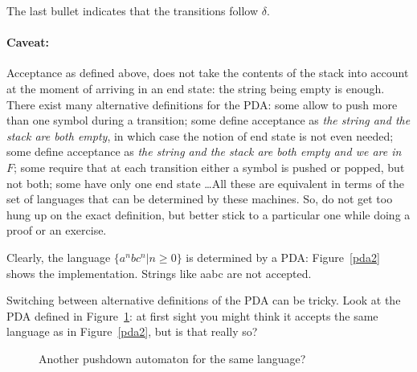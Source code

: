 The last bullet indicates that the transitions follow $\delta$.

\paragraph{Caveat:}

Acceptance as defined above, does not take the contents of the stack
into account at the moment of arriving in an end state: the string
being empty is enough. There exist many alternative definitions for
the PDA: some allow to push more than one symbol during a transition;
some define acceptance as {\em the string and the stack are both
  empty}, in which case the notion of end state is not even needed;
some define acceptance as {\em the string and the stack are both empty
  and we are in $F$}; some require that at each transition either a
symbol is pushed or popped, but not both; some have only one end state
\ldots All these are equivalent in terms of the set of languages that can
be determined by these machines. So, do not get too hung up on the
exact definition, but better stick to a particular one while doing a
proof or an exercise.



Clearly, the language $\{a^nbc^n|n \geq 0\}$ is determined by a PDA:
Figure~\ref{pda2} shows the implementation. Strings like aabc are not
accepted.

Switching between alternative definitions of the PDA can be
tricky. Look at the PDA defined in Figure~\ref{pda1}: at first sight
you might think it accepts the same language as in Figure~\ref{pda2},
but is that really so?

\begin{figure}[h]
\caption{Another pushdown automaton for the same language?\label{pda1}}
\end{figure}

